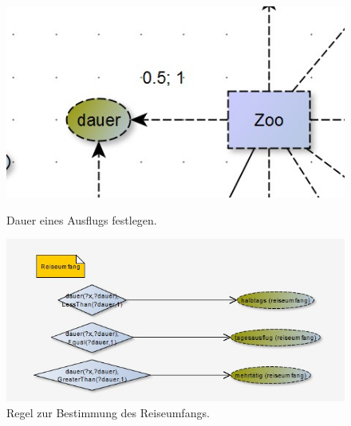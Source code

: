     \begin{figure}[H]%
        \begin{minipage}[hbt]{0,49\textwidth}
            \centering
            \includegraphics[scale=0.3]{bilder/dauer.jpg}
            \caption*{Dauer eines Ausflugs festlegen.\label{fig:dauer}\protect\footnotemark[2]}
        \end{minipage}
        \begin{minipage}[hbt]{0,49\textwidth}
            \centering
            \includegraphics[scale=0.3]{bilder/reiseUmfang.jpg}
            \caption*{Regel zur Bestimmung des Reiseumfangs.\label{fig:reiseumfang}\protect\footnotemark[2]}
        \end{minipage}
    \end{figure}


